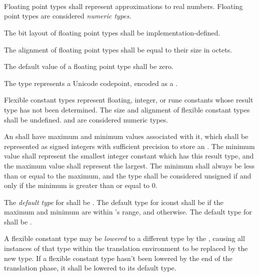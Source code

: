 
\begin{grammar}
 \\
	 \\
	 \\
\end{grammar}

\specsubsubitem
Floating point types shall represent approximations to real numbers. Floating
point types are considered \textit{numeric types}.

\specsubsubitem
The bit layout of floating point types shall be implementation-defined.

\specsubsubitem
The alignment of floating point types shall be equal to their size in octets.

\specsubsubitem
The default value of a floating point type shall be zero.


\specsubsubitem
The  type represents a Unicode codepoint, encoded as a
.


\specsubsubitem
Flexible constant types represent floating, integer, or rune constants whose
result type has not been determined. The size and alignment of flexible constant
types shall be undefined.  and  are considered
numeric types.

\specsubsubitem
An  shall have maximum and minimum values associated with it,
which shall be represented as signed integers with sufficient precision to store
an . The minimum value shall represent the smallest integer
constant which has this result type, and the maximum value shall represent the
largest. The minimum shall always be less than or equal to the maximum, and the
type shall be considered unsigned if and only if the minimum is greater than or
equal to 0.

\specsubsubitem
The \textit{default type} for  shall be . The
default type for iconst shall be  if the maximum and minimum are
within 's range, and  otherwise. The default type
for  shall be .

\specsubsubitem
A flexible constant type may be \textit{lowered} to a different type by the
, causing all instances of that
type within the translation environment to be replaced by the new type. If a
flexible constant type hasn't been lowered by the end of the translation phase,
it shall be lowered to its default type.

